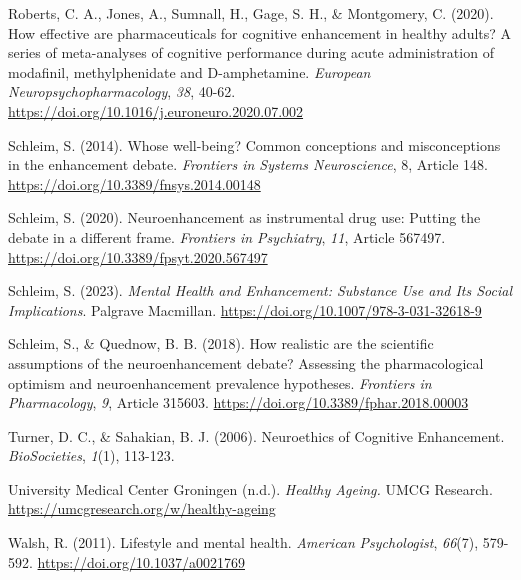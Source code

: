 \documentclass[authordate, empirical]{jote-new-article}
\begin{document}
Roberts, C. A., Jones, A., Sumnall, H., Gage, S. H., \& Montgomery, C. (2020). How effective are pharmaceuticals for cognitive enhancement in healthy adults? A series of meta-analyses of cognitive performance during acute administration of modafinil, methylphenidate and D-amphetamine. \emph{European Neuropsychopharmacology}, \emph{38}, 40-62. \url{https://doi.org/10.1016/j.euroneuro.2020.07.002}







Schleim, S. (2014). Whose well-being? Common conceptions and misconceptions in the enhancement debate. \emph{Frontiers in Systems Neuroscience}, 8, Article 148. \url{https://doi.org/10.3389/fnsys.2014.00148}







Schleim, S. (2020). Neuroenhancement as instrumental drug use: Putting the debate in a different frame. \emph{Frontiers in Psychiatry}, \emph{11}, Article 567497. \url{https://doi.org/10.3389/fpsyt.2020.567497}







Schleim, S. (2023). \emph{Mental Health and Enhancement: Substance Use and Its Social Implications}. Palgrave Macmillan. \url{https://doi.org/10.1007/978-3-031-32618-9}







Schleim, S., \& Quednow, B. B. (2018). How realistic are the scientific assumptions of the neuroenhancement debate? Assessing the pharmacological optimism and neuroenhancement prevalence hypotheses. \emph{Frontiers in Pharmacology}, \emph{9}, Article 315603. \url{https://doi.org/10.3389/fphar.2018.00003}







Turner, D. C., \& Sahakian, B. J. (2006). Neuroethics of Cognitive Enhancement. \emph{BioSocieties}, \emph{1}(1), 113-123.







University Medical Center Groningen (n.d.). \emph{Healthy Ageing. }UMCG Research. \url{https://umcgresearch.org/w/healthy-ageing}







Walsh, R. (2011). Lifestyle and mental health. \emph{American }\emph{Psychologist}, \emph{66}(7), 579-592. \url{https://doi.org/10.1037/a0021769}
\end{document}
